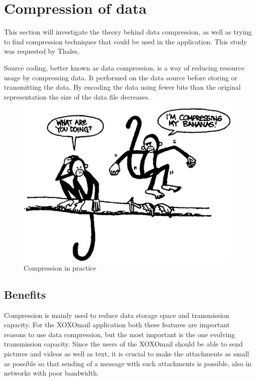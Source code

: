 
\section{Compression of data}\label{sec:compdata}

This section will investigate the theory behind data compression, as well as trying to find compression techniques that could be used in the application. This study was requested by Thales.
\newline

Source coding, better known as data compression, is a way of reducing resource usage by compressing data. It performed on the data source before storing or transmitting the data. By encoding the data using fewer bits than the original representation the size of the data file decreases.

\begin{figure}[h!]
\begin{center}
\includegraphics[scale=0.5]{compressionmonkeys}
\caption{Compression in practice \cite{bib:compressionImage}}
\end{center}
\end{figure}

\subsection{Benefits}
Compression is mainly used to reduce data storage space and transmission capacity. For the XOXOmail application both these features are important reasons to use data compression, but the most important is the one evolving transmission capacity. Since the users of the XOXOmail should be able to send pictures and videos as well as text, it is crucial to make the attachments as small as possible so that sending of a message with such attachments is possible, also in networks with poor bandwidth.


